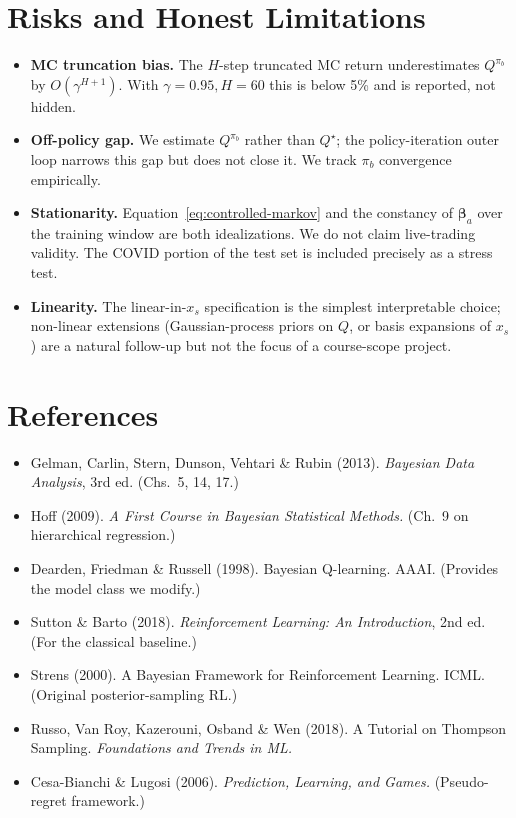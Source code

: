 \documentclass[11pt]{article}
\begin{document}
\section{Risks and Honest Limitations}

\begin{itemize}[leftmargin=*]
\item \textbf{MC truncation bias.} The $H$-step truncated MC return underestimates $Q^{\pi_b}$ by $O(\gamma^{H+1})$. With $\gamma=0.95, H=60$ this is below 5\% and is reported, not hidden.
\item \textbf{Off-policy gap.} We estimate $Q^{\pi_b}$ rather than $Q^\star$; the policy-iteration outer loop narrows this gap but does not close it. We track $\pi_b$ convergence empirically.
\item \textbf{Stationarity.} Equation~\eqref{eq:controlled-markov} and the constancy of $\bm\beta_a$ over the training window are both idealizations. We do not claim live-trading validity. The COVID portion of the test set is included precisely as a stress test.
\item \textbf{Linearity.} The linear-in-$x_s$ specification is the simplest interpretable choice; non-linear extensions (Gaussian-process priors on $Q$, or basis expansions of $x_s$) are a natural follow-up but not the focus of a course-scope project.
\end{itemize}

\section*{References}

\begin{itemize}[leftmargin=*,itemsep=0.1em]
\item Gelman, Carlin, Stern, Dunson, Vehtari \& Rubin (2013). \emph{Bayesian Data Analysis}, 3rd ed. (Chs.\ 5, 14, 17.)
\item Hoff (2009). \emph{A First Course in Bayesian Statistical Methods.} (Ch.\ 9 on hierarchical regression.)
\item Dearden, Friedman \& Russell (1998). Bayesian Q-learning. AAAI. (Provides the model class we modify.)
\item Sutton \& Barto (2018). \emph{Reinforcement Learning: An Introduction}, 2nd ed. (For the classical baseline.)
\item Strens (2000). A Bayesian Framework for Reinforcement Learning. ICML. (Original posterior-sampling RL.)
\item Russo, Van Roy, Kazerouni, Osband \& Wen (2018). A Tutorial on Thompson Sampling. \emph{Foundations and Trends in ML.}
\item Cesa-Bianchi \& Lugosi (2006). \emph{Prediction, Learning, and Games.} (Pseudo-regret framework.)
\end{itemize}
\end{document}
